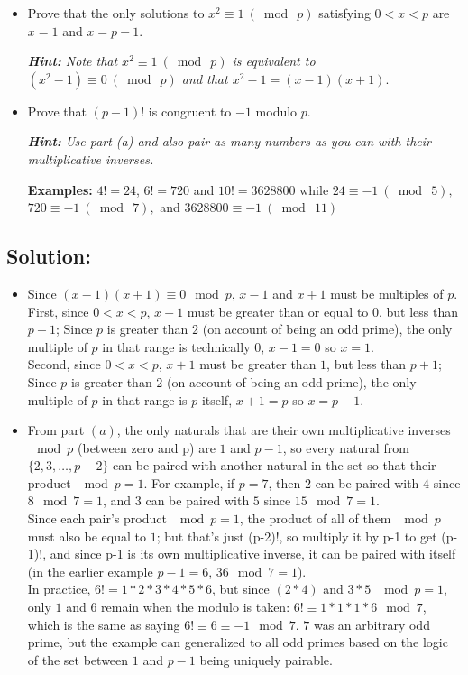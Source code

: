 \documentclass[12pt]{article}
\begin{document}
	\begin{itemize}
		\item[(a)] Prove that the only solutions to $x^{2} \equiv 1\  (\bmod \ p)$ satisfying
			$0 < x < p$ are $x=1$ and $x=p-1.$

			{\em \small {\bf Hint:} Note that $x^{2} \equiv 1 \ (\bmod \ p)$ is equivalent to $(x^{2}-1) \equiv 0\  (\bmod \ p)$ and that $x^{2} -1 = (x-1) (x+1).$ }

		\item[(b)] Prove that $(p - 1)!$ is congruent to $-1$ modulo $p$.

			{\em \small {\bf Hint:} Use part (a) and also pair as many numbers as you can with their multiplicative inverses.

			{\bf Examples:} $4!=24$, $6!=720$ and $10!=3628800$ while $24 \equiv -1 \ (\bmod\  5),$ $720 \equiv -1 \ (\bmod \ 7),$ and $3628800 \equiv -1 \ (\bmod \ 11)$

			}
	\end{itemize}

	\subsection*{\textbf{Solution:}}

	\begin{itemize}
		\item[(a)] Since $(x-1)(x+1)\equiv0\mod p$, $x-1$ and $x+1$ must be
			multiples of $p$.\\
			First, since $0<x<p$, $x-1$ must be greater than or equal to $0$, but less
			than $p-1$; Since $p$ is greater than $2$ (on account of being an odd prime),
			the only multiple of $p$ in that range is technically $0$, $x-1=0$ so
			$x=1$.\\
			Second, since $0<x<p$, $x+1$ must be greater than $1$, but less than $p+1$;
			Since $p$ is greater than $2$ (on account of being an odd prime), the only
			multiple of $p$ in that range is $p$ itself, $x+1=p$ so $x=p-1$.

		\item[(b)] From part $(a)$, the only naturals that are their own
			multiplicative inverses $\mod p$ (between zero and p) are $1$ and $p-1$, so
			every natural from $\{2,3,\ldots,p-2\}$ can be paired with another natural
			in the set so that their product $\mod p=1$. For example, if $p=7$, then
			$2$ can be paired with $4$ since $8\mod7=1$, and $3$ can be paired with $5$
			since $15\mod7=1$.\\
			Since each pair's product $\mod p=1$, the product of all of them $\mod p$
			must also be equal to $1$; but that's just (p-2)!, so multiply it by p-1 to
			get (p-1)!, and since p-1 is its own multiplicative inverse, it can be
			paired with itself (in the earlier example $p-1=6$, $36\mod 7 = 1$).\\
			In practice, $6!=1*2*3*4*5*6$, but since $(2*4)$ and $3*5$ $\mod p=1$,
			only $1$ and $6$ remain when the modulo is taken: $6!\equiv1*1*1*6 \mod7$,
			which is the same as saying $6!\equiv6\equiv-1\mod 7$. $7$ was an arbitrary
			odd prime, but the example can generalized to all odd primes based on the
			logic of the set between $1$ and $p-1$ being uniquely pairable.
	\end{itemize}
\end{document}
